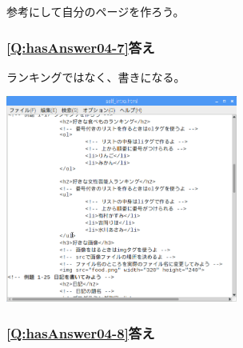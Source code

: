 \documentclass[a4paper,12pt]{jarticle}
\begin{document}
参考にして自分のページを作ろう。

\subsubsection{\bfseries
\ref*{Q:hasAnswer04-7}答え}

ランキングではなく、書きになる。

\centering
\includegraphics[width=7.622cm]{textbook-img236.png}
\flushleft

\bigskip

\subsubsection{\bfseries
\ref*{Q:hasAnswer04-8}答え}
\end{document}
